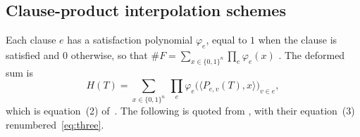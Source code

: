 \documentclass[11pt,a4paper]{article}
\theoremstyle{definition}
\theoremstyle{remark}
\begin{document}
\subsection{Clause-product interpolation schemes}\label{sec:def}

Each clause $e$ has a satisfaction polynomial $\varphi_e$, equal to $1$ when the clause is
satisfied and $0$ otherwise, so that
$\#F=\sum_{x\in\{0,1\}^n}\prod_e\varphi_e(x)$ \cite[(1)]{DL}. The deformed sum is
\begin{equation}\tag{DL.2}\label{eq:H}
H(T)=\sum_{x\in\{0,1\}^n}\ \prod_e\varphi_e\bigl(\langle P_{e,v}(T),x\rangle\bigr)_{v\in e},
\end{equation}
which is equation~(2) of~\cite{DL}. The following is quoted from \cite[Section~5]{DL}, with
their equation~(3) renumbered~\eqref{eq:three}.
\end{document}
